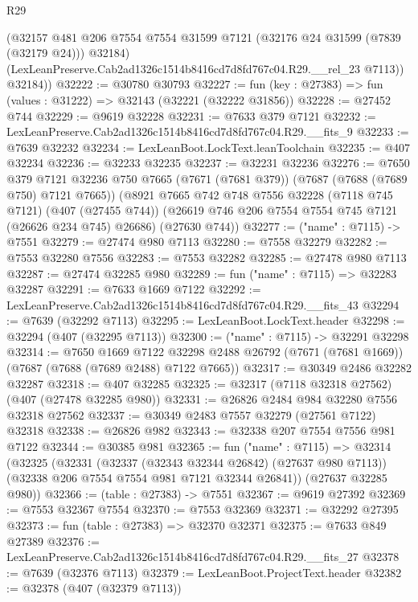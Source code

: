 \begin{lexlean}{R29}
\begin{coremodule}
          (@32157
            @481
            @206
            @7554
            @7554
            @31599
            @7121
            (@32176 @24 @31599 (@7839 (@32179 @24)))
            @32184)
          (LexLeanPreserve.Cab2ad1326c1514b8416cd7d8fd767c04.R29.__rel_23 @7113))
        @32184))
@32222 := @30780 @30793
@32227 := fun (key : @27383) => fun (values : @31222) => @32143 (@32221 (@32222 @31856))
@32228 := @27452 @744
@32229 := @9619 @32228
@32231 := @7633 @379 @7121
@32232 := LexLeanPreserve.Cab2ad1326c1514b8416cd7d8fd767c04.R29.__fits_9
@32233 := @7639 @32232
@32234 := LexLeanBoot.LockText.leanToolchain
@32235 := @407 @32234
@32236 := @32233 @32235
@32237 := @32231 @32236
@32276 := @7650
    @379
    @7121
    @32236
    @750
    @7665
    (@7671 (@7681 @379))
    (@7687 (@7688 (@7689 @750) @7121 @7665))
    (@8921
      @7665
      @742
      @748
      @7556
      @32228
      (@7118 @745 @7121)
      (@407 (@27455 @744))
      (@26619 @746 @206 @7554 @7554 @745 @7121 (@26626 @234 @745) @26686)
      (@27630 @744))
@32277 := ("name" : @7115) -> @7551
@32279 := @27474 @980 @7113
@32280 := @7558 @32279
@32282 := @7553 @32280 @7556
@32283 := @7553 @32282
@32285 := @27478 @980 @7113
@32287 := @27474 @32285 @980
@32289 := fun ("name" : @7115) => @32283 @32287
@32291 := @7633 @1669 @7122
@32292 := LexLeanPreserve.Cab2ad1326c1514b8416cd7d8fd767c04.R29.__fits_43
@32294 := @7639 (@32292 @7113)
@32295 := LexLeanBoot.LockText.header
@32298 := @32294 (@407 (@32295 @7113))
@32300 := ("name" : @7115) -> @32291 @32298
@32314 := @7650
    @1669
    @7122
    @32298
    @2488
    @26792
    (@7671 (@7681 @1669))
    (@7687 (@7688 (@7689 @2488) @7122 @7665))
@32317 := @30349 @2486 @32282 @32287
@32318 := @407 @32285
@32325 := @32317 (@7118 @32318 @27562) (@407 (@27478 @32285 @980))
@32331 := @26826 @2484 @984 @32280 @7556 @32318 @27562
@32337 := @30349 @2483 @7557 @32279 (@27561 @7122) @32318
@32338 := @26826 @982
@32343 := @32338 @207 @7554 @7556 @981 @7122
@32344 := @30385 @981
@32365 := fun ("name" : @7115) =>
  @32314
    (@32325
      (@32331
        (@32337 (@32343 @32344 @26842) (@27637 @980 @7113))
        (@32338 @206 @7554 @7554 @981 @7121 @32344 @26841))
      (@27637 @32285 @980))
@32366 := (table : @27383) -> @7551
@32367 := @9619 @27392
@32369 := @7553 @32367 @7554
@32370 := @7553 @32369
@32371 := @32292 @27395
@32373 := fun (table : @27383) => @32370 @32371
@32375 := @7633 @849 @27389
@32376 := LexLeanPreserve.Cab2ad1326c1514b8416cd7d8fd767c04.R29.__fits_27
@32378 := @7639 (@32376 @7113)
@32379 := LexLeanBoot.ProjectText.header
@32382 := @32378 (@407 (@32379 @7113))

\end{coremodule}
\end{lexlean}
